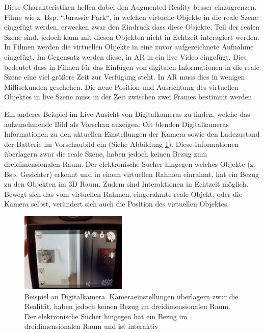 Diese Charakteristiken helfen dabei den Augmented Reality besser einzugrenzen. \cite{Azuma.1997} Filme wie z. Bsp. ``Jurassic Park``, in welchen virtuelle Objekte in die reale Szene eingefügt werden, 
erwecken zwar den Eindruck dass diese Objekte, Teil der realen Szene sind, jedoch kann mit diesen Objekten nicht in Echtzeit interagiert werden. \cite{Tonnis2010} In Filmen werden die virtuellen Objekte in eine zuvor aufgezeichnete Aufnahme eingefügt. 
Im Gegensatz werden diese, in AR in ein live Video eingefügt. Dies bedeutet dass in  Filmen für das Einfügen von digitalen Informationen in die reale Szene eine viel größere Zeit zur Verfügung steht. 
In AR muss dies in wenigen Millisekunden geschehen. Die neue Position und Ausrichtung des virtuellen Objektes in live Szene muss in der Zeit zwischen zwei Frames bestimmt werden.

Ein anderes Beispiel im Live Ansicht von Digitalkameras zu finden, welche das aufzunehmende Bild als Vorschau anzeigen. Oft blenden Digitalkameras Informationen zu den aktuellen Einstellungen der Kamera sowie den Ladezustand der Batterie im Vorschaubild ein (Siehe Abbildung \ref{img:ar_camera_example}).  
Diese Informationen überlagern zwar die reale Szene, haben jedoch keinen Bezug zum dreidimensionalen Raum. Der elektronische Sucher hingegen welches Objekte (z. Bsp. Gesichter) erkennt und in einem virtuellen Rahmen einrahmt, hat ein Bezug zu den Objekten im 3D Raum. Zudem sind Interaktionen in Echtzeit möglich. Bewegt sich das vom virtuellen Rahmen, eingerahmte reale Objekt, oder die Kamera selbst, verändert sich auch die Position des virtuellen Objektes. 

\begin{figure}[H]
	\centering
	\includegraphics[width=0.45\textwidth]{resources/fundamentals/example_camera_screen_ar}
	\caption{Beispiel an Digitalkamera. Kameraeinstellungen überlagern zwar die Realität, haben jedoch keinen Bezug im dreidimensionalen Raum. Der elektronische Sucher hingegen hat ein Bezug im dreidimensionalen Raum und ist interaktiv \cite{Beispiel Dititalkamera}}
	\label{img:ar_camera_example}
\end{figure}


